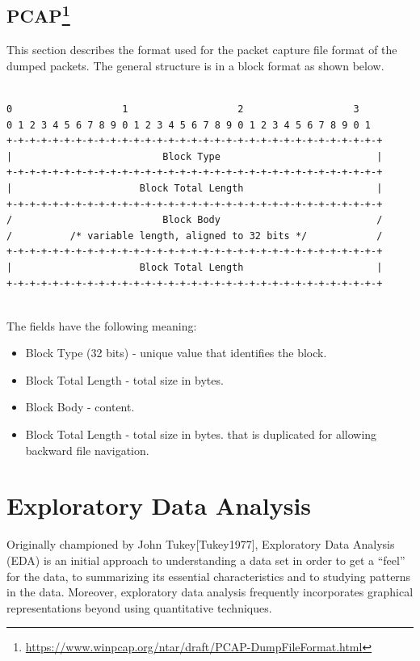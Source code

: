 \documentclass[12pt,]{article}
\begin{document}
\subsection[PCAP]{PCAP\footnote{\url{https://www.winpcap.org/ntar/draft/PCAP-DumpFileFormat.html}}}\label{pcap5}

This section describes the format used for the packet capture file
format of the dumped packets. The general structure is in a block format
as shown below.

\pagebreak

\begin{verbatim}

0                   1                   2                   3
0 1 2 3 4 5 6 7 8 9 0 1 2 3 4 5 6 7 8 9 0 1 2 3 4 5 6 7 8 9 0 1
+-+-+-+-+-+-+-+-+-+-+-+-+-+-+-+-+-+-+-+-+-+-+-+-+-+-+-+-+-+-+-+-+
|                          Block Type                           |
+-+-+-+-+-+-+-+-+-+-+-+-+-+-+-+-+-+-+-+-+-+-+-+-+-+-+-+-+-+-+-+-+
|                      Block Total Length                       |
+-+-+-+-+-+-+-+-+-+-+-+-+-+-+-+-+-+-+-+-+-+-+-+-+-+-+-+-+-+-+-+-+
/                          Block Body                           /
/          /* variable length, aligned to 32 bits */            /
+-+-+-+-+-+-+-+-+-+-+-+-+-+-+-+-+-+-+-+-+-+-+-+-+-+-+-+-+-+-+-+-+
|                      Block Total Length                       |
+-+-+-+-+-+-+-+-+-+-+-+-+-+-+-+-+-+-+-+-+-+-+-+-+-+-+-+-+-+-+-+-+    
    
\end{verbatim}

The fields have the following meaning:

\begin{itemize}
\itemsep1pt\parskip0pt
\item
  Block Type (32 bits) - unique value that identifies the block.
\item
  Block Total Length - total size in bytes.
\item
  Block Body - content.
\item
  Block Total Length - total size in bytes. that is duplicated for
  allowing backward file navigation.
\end{itemize}

\pagebreak

\section{Exploratory Data Analysis}\label{exploratory-data-analysis}

Originally championed by John Tukey{[}Tukey1977{]}, Exploratory Data
Analysis (EDA) is an initial approach to understanding a data set in
order to get a ``feel'' for the data, to summarizing its essential
characteristics and to studying patterns in the data. Moreover,
exploratory data analysis frequently incorporates graphical
representations beyond using quantitative techniques.
\end{document}
